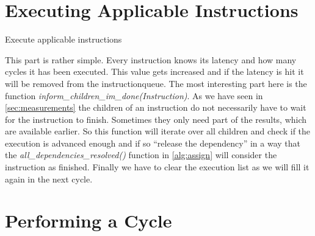 \newpage

\section{Executing Applicable Instructions}
\label{sec:execute}

\begin{algorithm}[H]
    \SetAlgoLined
    \caption{Execute applicable instructions}
    \label{alg:execute}
\end{algorithm}


This part is rather simple. Every instruction knows its latency and how many cycles it has been executed. This value gets increased and if the latency is hit it will be removed from the instructionqueue. The most interesting part here is the function \emph{inform\_children\_im\_done(Instruction)}. As we have seen in \autoref{sec:measurements} the children of an instruction do not necessarily have to wait for the instruction to finish. Sometimes they only need part of the results, which are available earlier. So this function will iterate over all children and check if the execution is advanced enough and if so ``release the dependency'' in a way that the \emph{all\_dependencies\_resolved()} function in \autoref{alg:assign} will consider the instruction as finished. Finally we have to clear the execution list as we will fill it again in the next cycle.

\section{Performing a Cycle}


